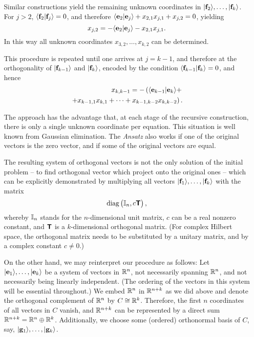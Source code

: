 \documentclass[%
 preprint,
 showpacs,
 showkeys,
 preprintnumbers,
 amsmath,amssymb,
 aps,
  pra,
  longbibliography,
 ]{revtex4-1}
\begin{document}
Similar constructions yield the remaining unknown coordinates in
$\vert {\bf f}_2 \rangle ,
\ldots       ,
\vert {\bf f}_k \rangle$.
For $j > 2$, $\langle {\bf f}_2 \vert {\bf f}_j \rangle = 0$,
and therefore
$
\langle {\bf e}_2 \vert {\bf e}_j \rangle + x_{2,1}  x_{j,1} +  x_{j,2} = 0
$,
yielding
\begin{equation}
x_{j,2} =  - \langle {\bf e}_2 \vert {\bf e}_j \rangle - x_{2,1}  x_{j,1}.
\end{equation}
In this way all unknown coordinates $x_{3,2}, \ldots , x_{k,2}$ can be determined.


This procedure is repeated until one arrives at $j = k-1$, and therefore at the orthogonality of
$\vert {\bf f}_{k-1} \rangle
$ and $
\vert {\bf f}_k \rangle$, encoded by the condition
$\langle {\bf f}_{k-1} \vert {\bf f}_k \rangle = 0$, and hence
\begin{equation}
\begin{aligned}
x_{k,k-1} = - \left( \langle {\bf e}_{k-1} \vert {\bf e}_k \rangle + \right.
\\
\left. + x_{k-1,1}  x_{k,1} + \cdots + x_{k-1,k-2}  x_{k,k-2} \right).
\end{aligned}
\end{equation}

The approach has the advantage that, at each stage of the recursive
construction, there is only a single unknown coordinate per equation.
This situation is well known from Gaussian elimination.
The {\it Ansatz}
also works if one of the original vectors is the zero vector, and if some of
the original vectors are equal.

The resulting system of orthogonal vectors is not the only solution of the initial problem
-- to find orthogonal vector which project onto the original ones -- which can be
explicitly demonstrated by multiplying all vectors $\vert {\bf f}_1 \rangle ,
\ldots , \vert {\bf f}_k \rangle$ with the matrix
\begin{equation}
{\rm diag} \begin{pmatrix} {\Bbb I}_n,c \textsf{\textbf{T}}\end{pmatrix},
\end{equation}
whereby ${\Bbb I}_n$ stands for the $n$-dimensional unit matrix, $c$ can be a
real nonzero constant, and $\textsf{\textbf{T}}$ is a $k$-dimensional
orthogonal matrix. (For complex Hilbert space, the orthogonal matrix needs to
be substituted by a unitary matrix, and by a complex constant $c\neq 0$.)


On the other hand, we may reinterpret our procedure as follows:
Let
$\vert{\bf e}_1\rangle, \ldots,\vert{\bf e}_k\rangle$ be a system of vectors
in ${\Bbb R}^n$, not necessarily spanning ${\Bbb R}^n$, and not necessarily being linearly independent.
(The ordering of the vectors in this system will be essential throughout.)
We embed ${\Bbb R}^n$ in ${\Bbb R}^{n+k}$ as we did above and
denote the orthogonal complement of ${\Bbb R}^n$ by $C \cong {\Bbb R}^k$.
Therefore, the first $n$ coordinates of all  vectors in $C$  vanish,
and ${\Bbb R}^{n+k}$ can be represented by a direct sum
${\Bbb R}^{n+k}= {\Bbb R}^n \oplus {\Bbb R}^k$.
Additionally, we choose some (ordered) orthonormal basis of $C$, say,
$\vert{\bf g}_{1}\rangle, \ldots,\vert{\bf g}_{k}\rangle$.
\end{document}
